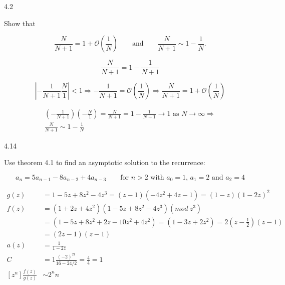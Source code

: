 \documentclass[12pt]{article}
\begin{document}
4.2

Show that

\begin{equation}
\frac{N}{N + 1} = 1 + \mathcal{O}\left(\frac{1}{N}\right) \qquad \text{and}
\qquad \frac{N}{N + 1} \sim 1 - \frac{1}{N}. \nonumber
\end{equation}

\begin{equation}
\frac{N}{N + 1} = 1 - \frac{1}{N + 1} \nonumber
\end{equation}

\begin{equation}
\left|- \frac{1}{N + 1} \frac{N}{1} \right| < 1 \Rightarrow -\frac{1}{N + 1} =
\mathcal{O}\left(\frac{1}{N}\right) \Rightarrow \frac{N}{N + 1} =
1 + \mathcal{O}\left(\frac{1}{N}\right)\nonumber
\end{equation}

\begin{equation}
\begin{split}
\left(-\frac{1}{N + 1}\right)\left(-\frac{N}{1}\right) = \frac{N}{N + 1} =
1 - \frac{1}{N + 1} \rightarrow 1 \text{ as } N \rightarrow \infty \Rightarrow\\
\frac{N}{N + 1} \sim 1 - \frac{1}{N}
\nonumber
\end{split}
\end{equation}

4.14

Use theorem 4.1 to find an asymptotic solution to the recurrence:

\[
a_n = 5a_{n - 1} - 8a_{n - 2} + 4a_{n - 3} \qquad \text{for $n > 2$ with
    $a_0 = 1$, $a_1 = 2$ and $a_2 = 4$} \nonumber
\]

\[
\begin{split}
g(z) & = 1 - 5z + 8z^2 - 4z^3 = (z - 1)(-4z^2 + 4z - 1) = (1 - z)(1 - 2z)^2 \\
f(z) & = (1 + 2z + 4z^2)(1 - 5z + 8z^2 - 4z^3)(mod\ z^3) \\
     & = (1 - 5z + 8z^2 + 2z - 10z^2 + 4z^2) = (1 - 3z + 2z^2)
     = 2(z - \frac{1}{2})(z - 1) \\
     & = (2z - 1)(z - 1) \\
a(z) & = \frac{1}{1 - 2z} \\
C & = 1\frac{(-2)^21}{16 - 24/2} = \frac{4}{4} = 1 \\
[z^n]\frac{f(z)}{g(z)} & \sim 2^nn
\end{split}
\]
\end{document}
